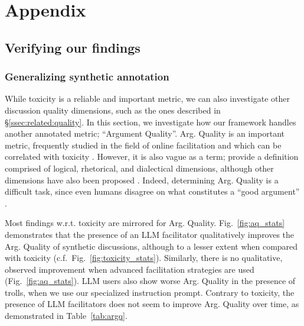 %
\section{Appendix}

\subsection{Verifying our findings}

\subsubsection{Generalizing synthetic annotation}

While toxicity is a reliable and important metric, we can also investigate other discussion quality dimensions, such as the ones described in \S\ref{ssec:related:quality}. In this section, we investigate how our framework handles another annotated metric; ``Argument Quality''. Arg. Quality is an important metric, frequently studied in the field of online facilitation \cite{argyle2023, schroeder-etal-2024-fora, falk-etal-2024-moderation, falk-etal-2021-predicting} and which can be correlated with toxicity \cite{chang-danescu-niculescu-mizil-2019-trouble}. However, it is also vague as a term; \citet{wachsmuth-etal-2017-computational} provide a definition comprised of logical, rhetorical, and dialectical dimensions, although other dimensions have also been proposed \cite{habernal-gurevych-2016-argument, persing-ng-2015-modeling}. Indeed, determining Arg. Quality is a difficult task, since even humans disagree on what constitutes a ``good argument” \cite{wachsmuth-etal-2017-computational, argyle2023}. 

Most findings w.r.t. toxicity are mirrored for Arg. Quality. Fig.~\ref{fig:aq_stats} demonstrates that the presence of an LLM facilitator qualitatively improves the Arg. Quality of synthetic discussions, although to a lesser extent when compared with toxicity (c.f.\  Fig.~\ref{fig:toxicity_stats}). Similarly, there is no qualitative, observed improvement when advanced facilitation strategies are used (Fig.~\ref{fig:aq_stats}). LLM users also show worse Arg. Quality in the presence of trolls, when we use our specialized instruction prompt. Contrary to toxicity, the presence of LLM facilitators does not seem to improve Arg. Quality over time, as demonstrated in Table~\ref{tab:argq}.

